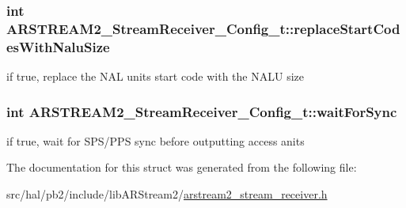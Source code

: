 \subsubsection[{\texorpdfstring{replace\+Start\+Codes\+With\+Nalu\+Size}{replaceStartCodesWithNaluSize}}]{\setlength{\rightskip}{0pt plus 5cm}int A\+R\+S\+T\+R\+E\+A\+M2\+\_\+\+Stream\+Receiver\+\_\+\+Config\+\_\+t\+::replace\+Start\+Codes\+With\+Nalu\+Size}\hypertarget{struct_a_r_s_t_r_e_a_m2___stream_receiver___config__t_aaecb0638e224440d69a17826500972d7}{}\label{struct_a_r_s_t_r_e_a_m2___stream_receiver___config__t_aaecb0638e224440d69a17826500972d7}
if true, replace the N\+AL units start code with the N\+A\+LU size 
\subsubsection[{\texorpdfstring{wait\+For\+Sync}{waitForSync}}]{\setlength{\rightskip}{0pt plus 5cm}int A\+R\+S\+T\+R\+E\+A\+M2\+\_\+\+Stream\+Receiver\+\_\+\+Config\+\_\+t\+::wait\+For\+Sync}\hypertarget{struct_a_r_s_t_r_e_a_m2___stream_receiver___config__t_aa7237c9022de4173df97d4e8f56579d7}{}\label{struct_a_r_s_t_r_e_a_m2___stream_receiver___config__t_aa7237c9022de4173df97d4e8f56579d7}
if true, wait for S\+P\+S/\+P\+PS sync before outputting access anits 

The documentation for this struct was generated from the following file\+:\begin{DoxyCompactItemize}
\item 
src/hal/pb2/include/lib\+A\+R\+Stream2/\hyperlink{arstream2__stream__receiver_8h}{arstream2\+\_\+stream\+\_\+receiver.\+h}\end{DoxyCompactItemize}
